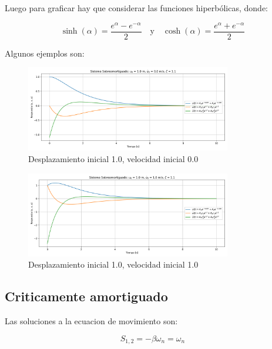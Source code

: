 \documentclass{article}  %
\begin{document}
Luego para graficar hay que considerar las funciones hiperbólicas, donde:

\begin{equation}
    \sinh(\alpha) = \frac{e^{\alpha} - e^{-\alpha}}{2} \quad \text{y} \quad \cosh(\alpha) = \frac{e^{\alpha} + e^{-\alpha}}{2}
\end{equation}

Algunos ejemplos son:

\begin{figure}[H]
    \centering
    \includegraphics[width=0.8\textwidth]{GRAFICOS/sis_sobreamortiguado_u0_1.0_v0_0.0_zeta_1.1.png}
    \caption{Desplazamiento inicial 1.0, velocidad inicial 0.0}
    \label{fig:ejemplo1}
\end{figure}

\begin{figure}[H]
    \centering
    \includegraphics[width=0.8\textwidth]{GRAFICOS/sis_sobreamortiguado_u0_1.0_v0_1.0_zeta_1.1.png}
    \caption{Desplazamiento inicial 1.0, velocidad inicial 1.0}
    \label{fig:ejemplo1}
\end{figure}

\subsection{Criticamente amortiguado}

Las soluciones a la ecuacion de movimiento son:

\begin{equation}
   S_{1,2} = -\beta \omega_n = \omega_n
\end{equation}
\end{document}
